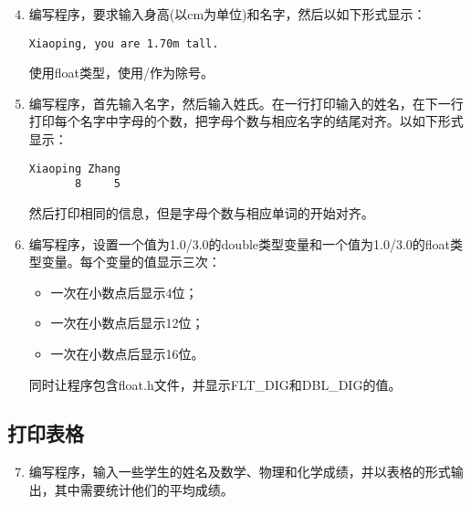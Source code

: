 \begin{frame}[fragile]\ft{\subsecname}
\begin{enumerate}\setcounter{enumi}{3} 
\item 编写程序，要求输入身高(以cm为单位)和名字，然后以如下形式显示：
\begin{lstlisting}[showspaces=true]
Xiaoping, you are 1.70m tall.
\end{lstlisting}
使用float类型，使用/作为除号。
\end{enumerate}
\end{frame}


\begin{frame}[fragile]\ft{\subsecname}
\begin{enumerate}\setcounter{enumi}{4} 
\item 编写程序，首先输入名字，然后输入姓氏。在一行打印输入的姓名，在下一行打印每个名字中字母的个数，把字母个数与相应名字的结尾对齐。以如下形式显示：
\begin{lstlisting}[showspaces=true]
Xiaoping Zhang
       8     5
\end{lstlisting}
然后打印相同的信息，但是字母个数与相应单词的开始对齐。
\end{enumerate}
\end{frame}


\begin{frame}[fragile]\ft{\subsecname}
\begin{enumerate}\setcounter{enumi}{5} 
\item 编写程序，设置一个值为1.0/3.0的double类型变量和一个值为1.0/3.0的float类型变量。每个变量的值显示三次：\\[0.05in]
\begin{itemize}
\item 一次在小数点后显示4位；\\[0.1in]
\item 一次在小数点后显示12位；\\[0.1in]
\item 一次在小数点后显示16位。\\[0.05in]
\end{itemize}
同时让程序包含float.h文件，并显示FLT\_DIG和DBL\_DIG的值。

\end{enumerate}
\end{frame}

\subsection{打印表格}
\begin{frame}\ft{\subsecname}
\begin{enumerate}\setcounter{enumi}{6} 
\item 编写程序，输入一些学生的姓名及数学、物理和化学成绩，并以表格的形式输出，其中需要统计他们的平均成绩。
\end{enumerate}
\end{frame}

